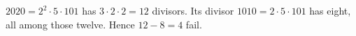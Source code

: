$2020=2^2\cdot5\cdot101$ has $3\cdot2\cdot2=12$ divisors. Its divisor $1010=2\cdot5\cdot101$ has eight, all among those twelve. Hence $12-8=\boxed4$ fail.
